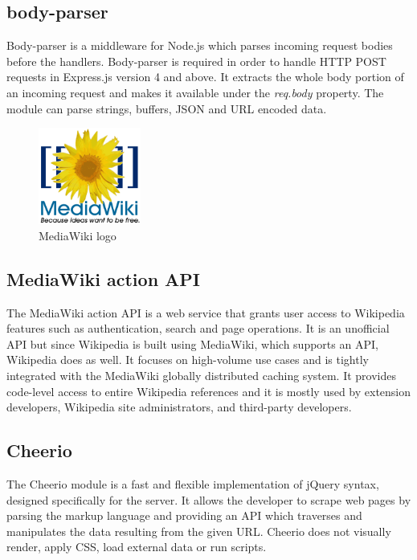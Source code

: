 \documentclass{report}
\begin{document}
\subsection {body-parser}
Body-parser is a middleware for Node.js which parses incoming request bodies before the handlers. Body-parser is required in order to handle HTTP POST requests in Express.js version 4 and above. It extracts the whole body portion of an incoming request and makes it available under the \textit{req.body} property. The module can parse strings, buffers, JSON and URL encoded data. 

\begin{figure}
	\vspace*{-1cm}
    \centering
    \includegraphics[width=0.3\textwidth]{mediawiki}
	\caption{MediaWiki logo}
	\vspace{-10pt} 
\end{figure}
\subsection {MediaWiki action API}
The MediaWiki action API is a web service that grants user access to Wikipedia features such as authentication, search and page operations. It is an unofficial API but since Wikipedia is built using MediaWiki, which supports an API, Wikipedia does as well. It focuses on high-volume use cases and is tightly integrated with the MediaWiki globally distributed caching system. It provides code-level access to entire Wikipedia references and it is mostly used by extension developers, Wikipedia site administrators, and third-party developers.

\subsection {Cheerio}
The Cheerio module is a fast and flexible implementation of jQuery syntax, designed specifically for the server. It allows the developer to scrape web pages by parsing the markup language and providing an API which traverses and manipulates the data resulting from the given URL. Cheerio does not visually render, apply CSS, load external data or run scripts.
\end{document}
